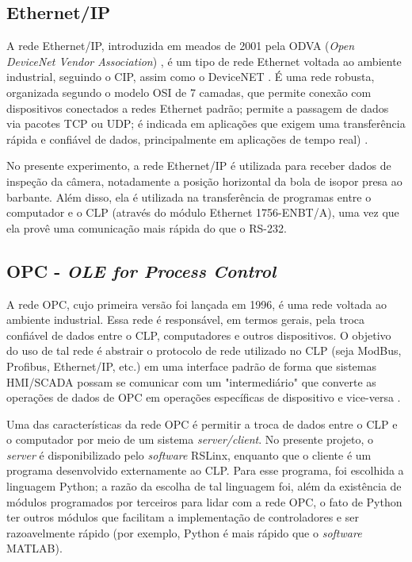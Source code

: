 \subsection{Ethernet/IP}
A rede Ethernet/IP, introduzida em meados de 2001 pela ODVA (\textit{Open DeviceNet Vendor Association}) \cite{eipodva1}, é um tipo de rede Ethernet voltada ao ambiente industrial, seguindo o CIP, assim como o DeviceNET \cite{eiprta}. É uma rede robusta, organizada segundo o modelo OSI de 7 camadas, que permite conexão com dispositivos conectados a redes Ethernet padrão; permite a passagem de dados via pacotes TCP ou UDP; é indicada em aplicações que exigem uma transferência rápida e confiável de dados, principalmente em aplicações de tempo real) \cite{eiprockwell}.

No presente experimento, a rede Ethernet/IP é utilizada para receber dados de inspeção da câmera, notadamente a posição horizontal da bola de isopor presa ao barbante. Além disso, ela é utilizada na transferência de programas entre o computador e o CLP (através do módulo Ethernet 1756-ENBT/A), uma vez que ela provê uma comunicação mais rápida do que o RS-232.

\subsection{OPC - \textit{OLE for Process Control}}
A rede OPC, cujo primeira versão foi lançada em 1996, é uma rede voltada ao ambiente industrial. Essa rede é responsável, em termos gerais, pela troca confiável de dados entre o CLP, computadores e outros dispositivos. O objetivo do uso de tal rede é abstrair o protocolo de rede utilizado no CLP (seja ModBus, Profibus, Ethernet/IP, etc.) em uma interface padrão de forma que sistemas HMI/SCADA possam se comunicar com um "intermediário" que converte as operações de dados de OPC em operações específicas de dispositivo e vice-versa \cite{OPCFoundation1}. 

Uma das características da rede OPC é permitir a troca de dados entre o CLP e o computador por meio de um sistema \textit{server/client}. No presente projeto, o \textit{server} é disponibilizado pelo \textit{software} RSLinx, enquanto que o cliente é um programa desenvolvido externamente ao CLP. Para esse programa, foi escolhida a linguagem Python; a razão da escolha de tal linguagem foi, além da existência de módulos programados por terceiros para lidar com a rede OPC, o fato de Python ter outros módulos que facilitam a implementação de controladores e ser razoavelmente rápido (por exemplo, Python é mais rápido que o \textit{software} MATLAB).


